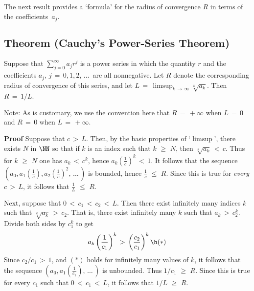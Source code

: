 \V
\V



\V
\V

        The next result provides a `formula' for the radius of convergence $R$ in terms of the coefficients~$a_{j}$.

\V

        \subsection{\small{{\bf Theorem}} (Cauchy's Power-Series Theorem)}
        \label{ThmG50.70}

\V

        Suppose that $\sum_{j=0}^{{\infty}} a_{j}r^{j}$ is a power series in which the quantity $r$ and the coefficients $a_{j}$, $j \,=\, 0,1,2,\,{\ldots}\,$ are all nonnegative.
    Let $R$ denote the corresponding radius of convergence of this series, and let $L \,=\, {\displaystyle {\limsup}_{k \,{\rightarrow}\, {\infty}} \sqrt[k]{a_{k}}}$.
    Then $R \,=\, 1/L$.

        Note: As is customary, we use the convention here that $R \,=\, +{\infty}$ when $L \,=\, 0$ and $R \,=\, 0$ when $L \,=\, +{\infty}$.

\V

        {\bf Proof} Suppose that $c\,>\,L$. Then, by the basic properties of `$\limsup$',
    there exists $N$ in ${\NN}$ so that if $k$ is an index such that $k\,\,{\geq}\,\,N$, then $\sqrt[k]{a_{k}}\,<\,c$.
    Thus for $k\,\,{\geq}\,\,N$ one has $a_{k}\,<\,c^{k}$, hence ${\displaystyle a_{k}\left(\frac{1}{c}\right)^{k}}\,<\,1$.
    It follows that the sequence ${\displaystyle \left(a_{0}, a_{1}\left(\frac{1}{c}\right), a_{2}\left(\frac{1}{c}\right)^{2},\,{\ldots}\,\right)}$ is bounded, hence ${\displaystyle \frac{1}{c}\,\,{\leq}\,\,R}$.
    Since this is true for {\em every} $c\,>\,L$, it follows that ${\displaystyle \frac{1}{L}\,\,{\leq}\,\,R}$.

        Next, suppose that $0\,<\,c_{1}\,<\,c_{2}\,<\,L$. Then there exist infinitely many indices $k$ such that $\sqrt[k]{a_{k}}\,>\,c_{2}$.
    That is, there exist infinitely many $k$ such that $a_{k}\,>\,c_{2}^{k}$.     Divide both sides by $c_{1}^{k}$ to get
        \begin{displaymath}
     a_{k}\left(\frac{1}{c_{1}}\right)^{k}
\,>\,\left(\frac{c_{2}}{c_{1}}\right)^{k} \h ({\ast})
        \end{displaymath}
    Since $c_{2}/c_{1}\,>\,1$, and $({\ast})$ holds for infinitely many values of $k$, it follows that the sequence ${\displaystyle \left(a_{0}, a_{1}\left(\frac{1}{c_{1}}\right), \,{\ldots}\,\right)}$ is unbounded.
    Thus $1/c_{1}\,\,{\geq}\,\,R$. Since this is true for every $c_{1}$ such that $0\,<\,c_{1}\,<\,L$, it follows that $1/L\,\,{\geq}\,\,R$.

